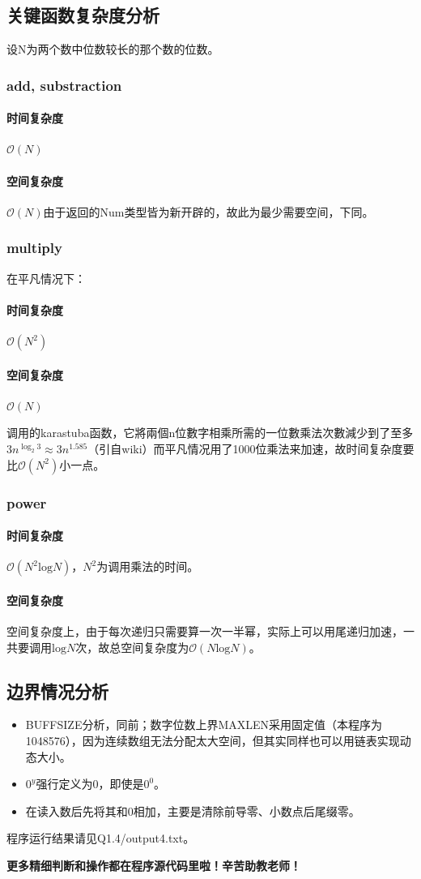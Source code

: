 \documentclass{homework}
\begin{document}
\subsection{关键函数复杂度分析}
设N为两个数中位数较长的那个数的位数。
\subsubsection{add, substraction}
\paragraph{时间复杂度} $\mathcal{O}(N)$
\paragraph{空间复杂度} $\mathcal{O}(N)$由于返回的Num类型皆为新开辟的，故此为最少需要空间，下同。
\subsubsection{multiply}
在平凡情况下：
\paragraph{时间复杂度} $\mathcal{O}(N^2)$
\paragraph{空间复杂度} $\mathcal{O}(N)$

调用的karastuba函数，它將兩個n位數字相乘所需的一位數乘法次數減少到了至多$3n^{\log _{2}3}\approx 3n^{1.585}$（引自wiki）而平凡情况用了1000位乘法来加速，故时间复杂度要比$\mathcal{O}(N^2)$小一点。
\subsubsection{power}
\paragraph{时间复杂度} $\mathcal{O}(N^2\mathrm{log}N)$，$N^2$为调用乘法的时间。
\paragraph{空间复杂度} 空间复杂度上，由于每次递归只需要算一次一半幂，实际上可以用尾递归加速，一共要调用$\mathrm{log}N$次，故总空间复杂度为$\mathcal{O}(N\mathrm{log}N)$。
\subsection{边界情况分析}
\begin{itemize}
    \item BUFFSIZE分析，同前；数字位数上界MAXLEN采用固定值（本程序为1048576），因为连续数组无法分配太大空间，但其实同样也可以用链表实现动态大小。
    \item $0^y$强行定义为0，即使是$0^0$。
    \item 在读入数后先将其和0相加，主要是清除前导零、小数点后尾缀零。
\end{itemize}
程序运行结果请见Q1.4/output4.txt。

{\bf 更多精细判断和操作都在程序源代码里啦！辛苦助教老师！}
\end{document}
